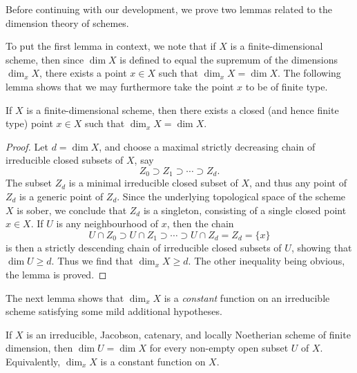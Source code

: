 \noindent
Before continuing with our development,
we prove two lemmas related to the dimension theory of schemes.

\medskip\noindent
To put the first lemma in context,
we note that if $X$ is a finite-dimensional scheme, then since $\dim X$
is defined to equal the supremum of the dimensions $\dim_x X$,
there exists a point $x \in X$ such that $\dim_x X = \dim X$.
The following lemma shows that we may furthermore take the point
$x$ to be of finite type.

\begin{lemma}
\label{lemma-dimension-achieved-by-finite-type-point}
If $X$ is a finite-dimensional scheme,
then there exists a closed (and hence finite type) point $x \in X$
such that $\dim_x X = \dim X$.
\end{lemma}

\begin{proof}
Let $d = \dim X$,
and choose a maximal strictly decreasing
chain of irreducible closed subsets of $X$,
say
\begin{equation}
\label{equation-maximal-chain}
Z_0 \supset Z_1 \supset \cdots \supset Z_d.
\end{equation}
The subset $Z_d$ is a minimal irreducible closed subset of $X$,
and thus any point of $Z_d$ is a generic point of $Z_d$.
Since the underlying topological space of the scheme $X$ is sober,
we conclude that $Z_d$ is a singleton, consisting of a single
closed point $x \in X$.
If $U$ is
any neighbourhood of $x$, then
the chain
$$
U\cap Z_0 \supset U\cap Z_1 \supset \cdots \supset U\cap Z_d = Z_d =
\{x\}
$$
is then a strictly descending chain of irreducible
closed subsets of $U$, showing that $\dim U \geq d$.
Thus we find that $\dim_x X \geq d$.  The other inequality
being obvious, the lemma is proved.
\end{proof}

\noindent
The next lemma shows that $\dim_x X$ is a {\it constant} function
on an irreducible scheme satisfying some mild additional hypotheses.

\begin{lemma}
\label{lemma-constancy-of-dimension}
If $X$ is an irreducible, Jacobson, catenary, and locally Noetherian
scheme of finite dimension,
then $\dim U = \dim X$ for every
non-empty open subset $U$ of $X$.
Equivalently, $\dim_x X$ is a constant function on $X$.
\end{lemma}

